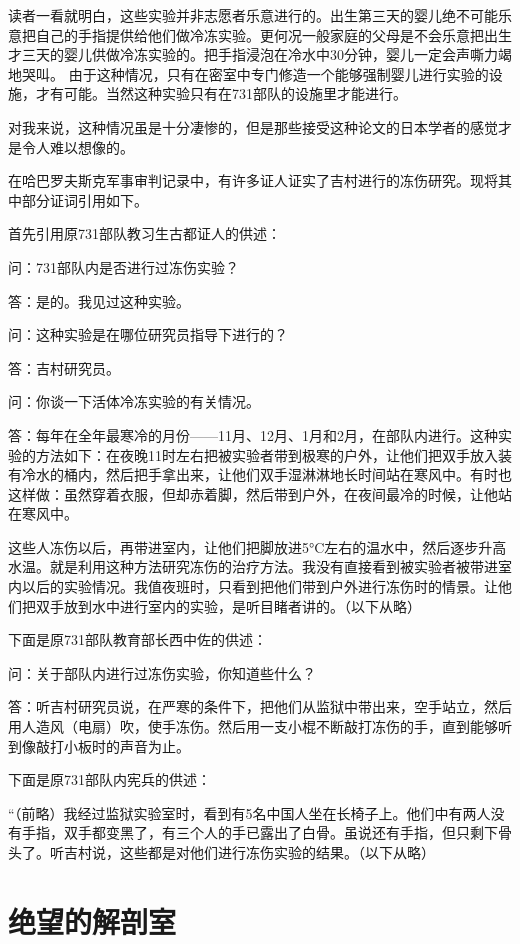 \documentclass[a4paper,12pt,UTF8,twoside]{ctexbook}
\begin{document}
读者一看就明白，这些实验并非志愿者乐意进行的。出生第三天的婴儿绝不可能乐意把自己的手指提供给他们做冷冻实验。更何况一般家庭的父母是不会乐意把出生才三天的婴儿供做冷冻实验的。把手指浸泡在冷水中30分钟，婴儿一定会声嘶力竭地哭叫。
由于这种情况，只有在密室中专门修造一个能够强制婴儿进行实验的设施，才有可能。当然这种实验只有在731部队的设施里才能进行。

对我来说，这种情况虽是十分凄惨的，但是那些接受这种论文的日本学者的感觉才是令人难以想像的。

在哈巴罗夫斯克军事审判记录中，有许多证人证实了吉村进行的冻伤研究。现将其中部分证词引用如下。

首先引用原731部队教习生古都证人的供述：

问：731部队内是否进行过冻伤实验？

答：是的。我见过这种实验。

问：这种实验是在哪位研究员指导下进行的？

答：吉村研究员。

问：你谈一下活体冷冻实验的有关情况。

答：每年在全年最寒冷的月份——11月、12月、1月和2月，在部队内进行。这种实验的方法如下：在夜晚11时左右把被实验者带到极寒的户外，让他们把双手放入装有冷水的桶内，然后把手拿出来，让他们双手湿淋淋地长时间站在寒风中。有时也这样做：虽然穿着衣服，但却赤着脚，然后带到户外，在夜间最冷的时候，让他站在寒风中。

这些人冻伤以后，再带进室内，让他们把脚放进5°C左右的温水中，然后逐步升高水温。就是利用这种方法研究冻伤的治疗方法。我没有直接看到被实验者被带进室内以后的实验情况。我值夜班时，只看到把他们带到户外进行冻伤时的情景。让他们把双手放到水中进行室内的实验，是听目睹者讲的。（以下从略）

下面是原731部队教育部长西中佐的供述：

问：关于部队内进行过冻伤实验，你知道些什么？

答：听吉村研究员说，在严寒的条件下，把他们从监狱中带出来，空手站立，然后用人造风（电扇）吹，使手冻伤。然后用一支小棍不断敲打冻伤的手，直到能够听到像敲打小板时的声音为止。

下面是原731部队内宪兵的供述：

“（前略）我经过监狱实验室时，看到有5名中国人坐在长椅子上。他们中有两人没有手指，双手都变黑了，有三个人的手已露出了白骨。虽说还有手指，但只剩下骨头了。听吉村说，这些都是对他们进行冻伤实验的结果。（以下从略）

\section{绝望的解剖室}
\end{document}
